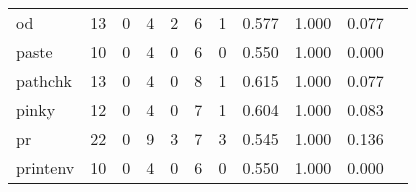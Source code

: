 \begin{longtable}{lp{1.2cm}p{1.2cm}p{1.2cm}p{1.2cm}p{1.2cm}p{1.2cm}p{1.2cm}p{1.2cm}p{1.2cm}p{1.2cm}}
od        &                                    13 &                                                  0 &                                                  4 &                                                  2 &                                                  6 &                                                  1 &                                              0.577 &                                              1.000 &                                              0.077 \\
paste     &                                    10 &                                                  0 &                                                  4 &                                                  0 &                                                  6 &                                                  0 &                                              0.550 &                                              1.000 &                                              0.000 \\
pathchk   &                                    13 &                                                  0 &                                                  4 &                                                  0 &                                                  8 &                                                  1 &                                              0.615 &                                              1.000 &                                              0.077 \\
pinky     &                                    12 &                                                  0 &                                                  4 &                                                  0 &                                                  7 &                                                  1 &                                              0.604 &                                              1.000 &                                              0.083 \\
pr        &                                    22 &                                                  0 &                                                  9 &                                                  3 &                                                  7 &                                                  3 &                                              0.545 &                                              1.000 &                                              0.136 \\
printenv  &                                    10 &                                                  0 &                                                  4 &                                                  0 &                                                  6 &                                                  0 &                                              0.550 &                                              1.000 &                                              0.000 \\

\end{longtable}
